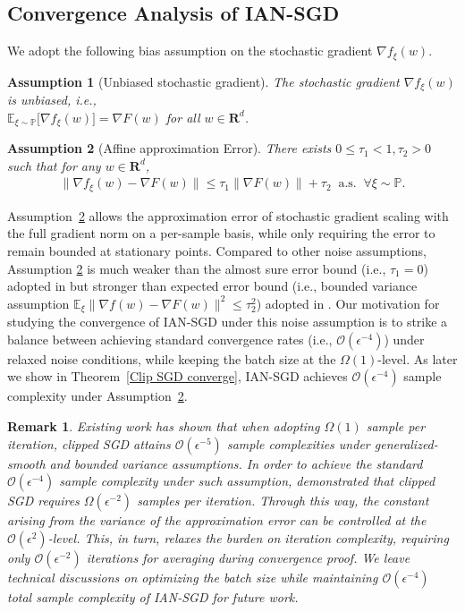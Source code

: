 \documentclass[10pt]{article} %
\newtheorem{remark}{Remark}
\newtheorem{assumption}{Assumption}
\begin{document}
\subsection{Convergence Analysis of IAN-SGD}
We adopt the following bias assumption on the stochastic gradient $\nabla f_{\xi}(w)$.
\begin{assumption}[Unbiased stochastic gradient]\label{unbiasness}
The stochastic gradient $\nabla f_{\xi}(w)$ is unbiased, i.e.,\\ $\mathbb{E}_{\xi\sim \mathbb{P}}\big [\nabla f_{\xi}(w)\big] = \nabla F(w)$ for all $w\in\mathbf{R}^d$.
\end{assumption}
\begin{assumption}[Affine approximation Error]\label{assum6}
    There exists  $0\leq\tau_1<1, \tau_2>0$ such that for any $w\in \mathbf{R}^d$,
    \begin{align}
    \big \|\nabla f_{\xi}(w)-\nabla F(w)\| \leq \tau_1 \big \| \nabla F(w)\big \| + \tau_2 ~\text{ a.s. }~ \forall \xi \sim \mathbb{P}.
    \label{affinebound}
    \end{align}
\end{assumption}
Assumption~\ref{assum6} allows the approximation error of stochastic gradient scaling with the full gradient norm on a per-sample basis, while only requiring the error to remain bounded at stationary points. Compared to other noise assumptions, Assumption \ref{assum6} is much weaker than the almost sure error bound (i.e., $\tau_1 = 0$) adopted in \citet{zhang2020gradientclippingacceleratestraining,genralclip,mingruiclip} but stronger than expected error bound (i.e., bounded variance assumption $\mathbb{E}_{\xi}\|\nabla f(w)-\nabla F(w) \|^2 \leq \tau_2^2 $) adopted in \citet{usitchclip, reisizadeh2023variancereducedclippingnonconvexoptimization}. Our motivation for studying the convergence of IAN-SGD under this noise assumption is to strike a balance between achieving standard convergence rates (i.e., $\mathcal{O}(\epsilon^{-4})$) under relaxed noise conditions, while keeping the batch size at the $\Omega(1)$-level. As later we show in Theorem~\ref{Clip SGD converge}, IAN-SGD achieves $\mathcal{O}(\epsilon^{-4})$ sample complexity under Assumption~\ref{assum6}. 
\begin{remark}
    Existing work \citep{usitchclip} has shown that when adopting $\Omega(1)$ sample per iteration, clipped SGD attains $\mathcal{O}(\epsilon^{-5})$ sample complexities under generalized-smooth and bounded variance assumptions.
    In order to achieve the standard $\mathcal{O}(\epsilon^{-4})$ sample complexity under such assumption, \cite{reisizadeh2023variancereducedclippingnonconvexoptimization} demonstrated that clipped SGD requires $\Omega(\epsilon^{-2})$ samples per iteration. Through this way, the constant arising from the variance of the approximation error can be controlled at the $\mathcal{O}(\epsilon^2)$-level. This, in turn, relaxes the burden on iteration complexity, requiring only $\mathcal{O}(\epsilon^{-2})$ iterations for averaging during convergence proof. We leave technical discussions on optimizing the batch size while maintaining $\mathcal{O}(\epsilon^{-4})$ total sample complexity of IAN-SGD for future work.
\end{remark}
\end{document}
